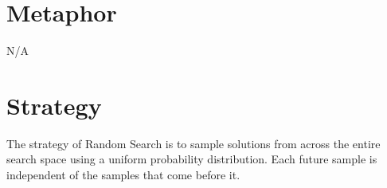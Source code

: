 \documentclass[a4paper, 11pt]{article}
\begin{document}
\section{Metaphor}
\label{sec:metaphor}
N/A

\section{Strategy}
\label{sec:strategy}
The strategy of Random Search is to sample solutions from across the entire search space using a uniform probability distribution. Each future sample is independent of the samples that come before it.

\end{document}
